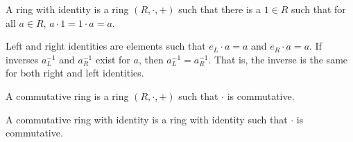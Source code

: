     \begin{definition}
        A ring with identity is a ring $(R,\cdot,+)$
        such that there is a ${1}\in{R}$ such that for
        all ${a}\in{R}$, ${a}\cdot{1}={1}\cdot{a}=a$.
    \end{definition}
    Left and right identities are elements such that ${e_{L}}\cdot{a}=a$
    and ${e_{R}}\cdot{a}=a$. If inverses $a_{L}^{-1}$ and $a_{R}^{-1}$
    exist for $a$, then $a_{L}^{-1}=a_{R}^{-1}$. That is, the inverse
    is the same for both right and left identities.
    \begin{definition}
        A commutative ring is a ring $(R,\cdot,+)$ such that
        $\cdot$ is commutative.
    \end{definition}
    \begin{definition}
        A commutative ring with identity is a ring with identity such
        that $\cdot$ is commutative.
    \end{definition}